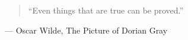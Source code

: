 \documentclass[a4paper,12pt,listof=totoc,index=totoc,bibliography=totoc,headsepline=false,headings=normal,BCOR16.153846mm,DIV12,headinclude,twoside,cleardoublepage=empty,numbers=noenddot,final]{scrreprt}
\theoremstyle{mystyle}
\numberwithin{equation}{section}
\numberwithin{figure}{section}
\numberwithin{lemma}{section}
\numberwithin{theorem}{section}
\numberwithin{corollary}{section}
\numberwithin{definition}{section}
\numberwithin{conjecture}{section}
\numberwithin{observation}{section}
\newcommand{\+}{\mkern2mu}
\DeclareMathOperator{\1}{\mathds{1}}
\begin{document}
\cleardoublepage


\thispagestyle{empty}
\vspace*{6cm}
\begin{quotation}
  ``Even things that are true can be proved.''
\end{quotation}
\begin{flushright}
--- Oscar Wilde, The Picture of Dorian Gray
\end{flushright}

\cleardoublepage




\tableofcontents \label{toc}

\end{document}
